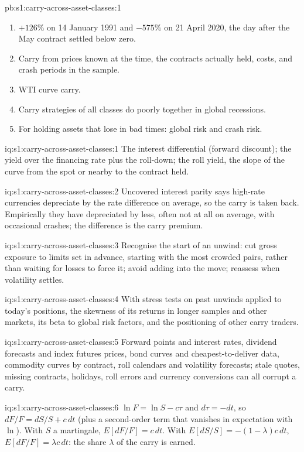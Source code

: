 \begin{solution}{pb:s1:carry-across-asset-classes:1}
\begin{enumerate}
\item $+126\%$ on 14 January 1991 and $-575\%$ on 21 April 2020, the day after the May contract settled below zero.
\item Carry from prices known at the time, the contracts actually held, costs, and crash periods in the sample.
\item WTI curve carry.
\item Carry strategies of all classes do poorly together in global recessions.
\item For holding assets that lose in bad times: global risk and crash risk.
\end{enumerate}
\end{solution}

\begin{solution}{iq:s1:carry-across-asset-classes:1}
The interest differential (forward discount); the yield over the financing rate plus the roll-down; the roll yield, the slope of the curve from the spot
or nearby to the contract held.
\end{solution}

\begin{solution}{iq:s1:carry-across-asset-classes:2}
Uncovered interest parity says high-rate currencies depreciate by the rate difference on average, so the carry is taken back. Empirically they have
depreciated by less, often not at all on average, with occasional crashes; the difference is the carry premium.
\end{solution}

\begin{solution}{iq:s1:carry-across-asset-classes:3}
Recognise the start of an unwind: cut gross exposure to limits set in advance, starting with the most crowded pairs, rather than waiting for losses to
force it; avoid adding into the move; reassess when volatility settles.
\end{solution}

\begin{solution}{iq:s1:carry-across-asset-classes:4}
With stress tests on past unwinds applied to today's positions, the skewness of its returns in longer samples and other markets, its beta to global
risk factors, and the positioning of other carry traders.
\end{solution}

\begin{solution}{iq:s1:carry-across-asset-classes:5}
Forward points and interest rates, dividend forecasts and index futures prices, bond curves and cheapest-to-deliver data, commodity curves by contract,
roll calendars and volatility forecasts; stale quotes, missing contracts, holidays, roll errors and currency conversions can all corrupt a carry.
\end{solution}

\begin{solution}{iq:s1:carry-across-asset-classes:6}
$\ln F = \ln S - c\tau$ and $d\tau = -dt$, so $dF/F = dS/S + c\,dt$ (plus a second-order term that vanishes in expectation with $\ln$). With $S$ a
martingale, $E[dF/F] = c\,dt$. With $E[dS/S] = -(1 - \lambda)c\,dt$, $E[dF/F] = \lambda c\,dt$: the share $\lambda$ of the carry is earned.
\end{solution}
